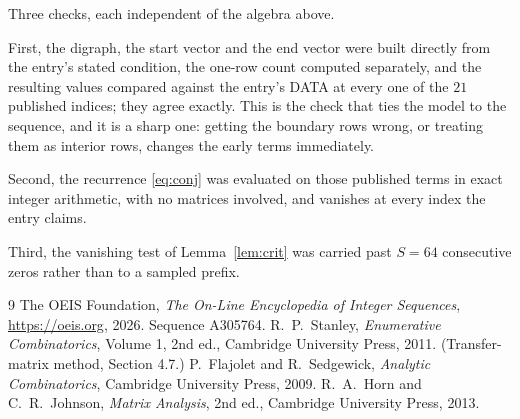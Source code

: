 \documentclass[11pt,a4paper]{article}
\theoremstyle{plain}
\theoremstyle{definition}
\begin{document}
Three checks, each independent of the algebra above.

First, the digraph, the start vector and the end vector were built directly from the
entry's stated condition, the one-row count computed separately, and the resulting values
compared against the entry's DATA at every one of the $21$ published indices; they
agree exactly. This is the check that ties the model to the sequence, and it is a sharp one:
getting the boundary rows wrong, or treating them as interior rows, changes the early terms
immediately.

Second, the recurrence \eqref{eq:conj} was evaluated on those published terms in exact
integer arithmetic, with no matrices involved, and vanishes at every index the entry claims.

Third, the vanishing test of Lemma~\ref{lem:crit} was carried past $S=64$ consecutive
zeros rather than to a sampled prefix.

\begin{thebibliography}{9}
 The OEIS Foundation, \emph{The On-Line Encyclopedia of Integer
Sequences}, \url{https://oeis.org}, 2026. Sequence A305764.
 R.~P.~Stanley, \emph{Enumerative Combinatorics}, Volume 1, 2nd ed.,
Cambridge University Press, 2011. (Transfer-matrix method, Section 4.7.)
 P.~Flajolet and R.~Sedgewick, \emph{Analytic Combinatorics}, Cambridge
University Press, 2009.
 R.~A.~Horn and C.~R.~Johnson, \emph{Matrix Analysis}, 2nd ed., Cambridge
University Press, 2013.
\end{thebibliography}
\end{document}
